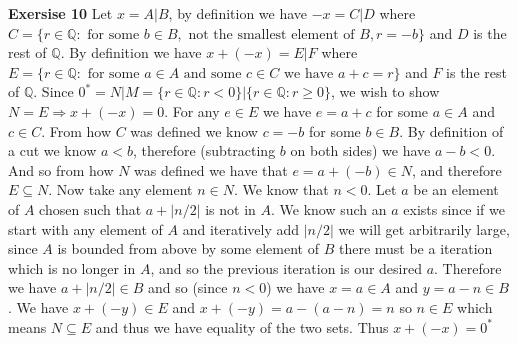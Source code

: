 \documentclass[12pt]{article}
\newcounter{ques}[section]
\newenvironment{ques}[1]{\textbf{Exersise #1} \vspace{1mm}}{\medskip}
\theoremstyle{definition}
\begin{document}
\begin{ques}{10}
	Let $x = A|B$, by definition we have $-x = C|D$ where $C = \{r \in
	\mathbb Q : \text{ for some } b \in B, \text{ not the smallest element
	of }B, r = -b\}$ and $D$ is the rest of $\mathbb Q$. By definition we
	have $x + (-x) = E|F$ where $E = \{r \in \mathbb Q: \text{ for some } a
	\in A \text{ and some } c \in C \text{ we have } a + c = r\}$ and $F$
	is the rest of $\mathbb Q$. Since $0^* = N|M = \{r \in \mathbb Q: r <
	0\}|\{r \in \mathbb Q: r \geq 0\}$, we wish to show $N = E \Rightarrow
	x + (-x) = 0$. For any $e \in E$ we have $e = a + c$ for some $a \in A$
	and $c \in C$. From how $C$ was defined we know $c = -b$ for some $b
	\in B$. By definition of a cut we know $a < b$, therefore (subtracting
	$b$ on both sides) we have $a - b < 0$. And so from how $N$ was defined
	we have that $e = a + (- b) \in N$, and therefore $E \subseteq N$. Now
	take any element $n \in N$. We know that $n < 0$. Let $a$ be an element of
	$A$ chosen such that $a + |n/2|$ is not in $A$. We know such an $a$
	exists since if we start with any element of $A$ and iteratively add
	$|n/2|$ we will get arbitrarily large, since $A$ is bounded from
	above by some element of $B$ there must be a iteration which is no
	longer in $A$, and so the previous iteration is our desired $a$.
	Therefore we have $a + |n/2| \in B$ and so (since $n < 0$) we have $x =
	a \in A$ and $y = a - n \in B$.  We have $x + (-y) \in E$ and $x
	+ (-y) = a - (a - n) = n$ so $n \in E$ which means $N \subseteq E$ and
	thus we have equality of the two sets. Thus $x + (-x) = 0^*$
\end{ques}
\end{document}
